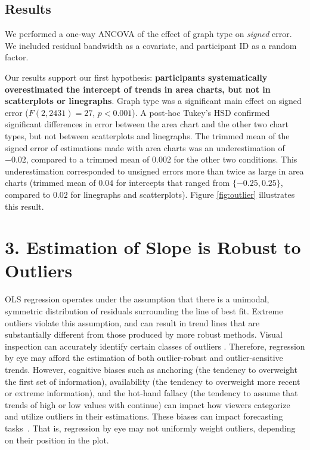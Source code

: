 \documentclass{sigchi}
\begin{document}
\subsection{Results}
We performed a one-way ANCOVA of the effect of graph type on \emph{signed} error. We included residual bandwidth as a covariate, and participant ID as a random factor. 

Our results support our first hypothesis: \textbf{participants systematically overestimated the intercept of trends in area charts, but not in scatterplots or linegraphs}. Graph type was a significant main effect on signed error ($F(2,2431)=27$, $p<0.001$). A post-hoc Tukey's HSD confirmed significant differences in error between the area chart and the other two chart types, but not between scatterplots and linegraphs. The trimmed mean of the signed error of estimations made with area charts was an underestimation of $-0.02$, compared to a trimmed mean of $0.002$ for the other two conditions. This underestimation corresponded to unsigned errors more than twice as large in area charts (trimmed mean of $0.04$ for intercepts that ranged from $\{-0.25,0.25\}$, compared to $0.02$ for linegraphs and scatterplots). Figure \ref{fig:outlier} illustrates this result. 
 
\section{3. Estimation of Slope is Robust to Outliers}

\outlierFig
OLS regression operates under the assumption that there is a unimodal, symmetric distribution of residuals surrounding the line of best fit. Extreme outliers violate this assumption, and can result in trend lines that are substantially different from those produced by more robust methods. Visual inspection can accurately identify certain classes of outliers \cite{albers2014task}. Therefore, regression by eye may afford the estimation of both outlier-robust and outlier-sensitive trends. However, cognitive biases such as anchoring (the tendency to overweight the first set of information), availability (the tendency to overweight more recent or extreme information), and the hot-hand fallacy (the tendency to assume that trends of high or low values with continue) can impact how viewers categorize and utilize outliers in their estimations. These biases can impact forecasting tasks~\cite{campbell2009anchoring,ji2001culture}. That is, regression by eye may not uniformly weight outliers, depending on their position in the plot.
\end{document}

